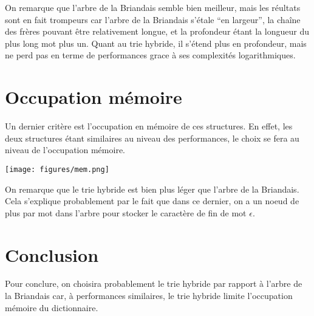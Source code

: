 \documentclass[11pt]{report} %
\begin{document}
On remarque que l'arbre de la Briandais semble bien meilleur, mais les réultats sont en fait trompeurs car l'arbre de la Briandais s'étale ``en largeur'', la chaîne des frères pouvant être relativement longue, et la profondeur étant la longueur du plus long mot plus un. Quant au trie hybride, il s'étend plus en profondeur, mais ne perd pas en terme de performances grace à ses complexités logarithmiques.

\section{Occupation mémoire}

Un dernier critère est l'occupation en mémoire de ces structures. En effet, les deux structures étant similaires au niveau des performances, le choix se fera au niveau de l'occupation mémoire.

\begin{center}
\texttt{[image: figures/mem.png]}
\end{center}

On remarque que le trie hybride est bien plus léger que l'arbre de la Briandais. Cela s'explique probablement par le fait que dans ce dernier, on a un noeud de plus par mot dans l'arbre pour stocker le caractère de fin de mot $\epsilon$.

\section{Conclusion}

Pour conclure, on choisira probablement le trie hybride par rapport à l'arbre de la Briandais car, à performances similaires, le trie hybride limite l'occupation mémoire du dictionnaire.
\end{document}
